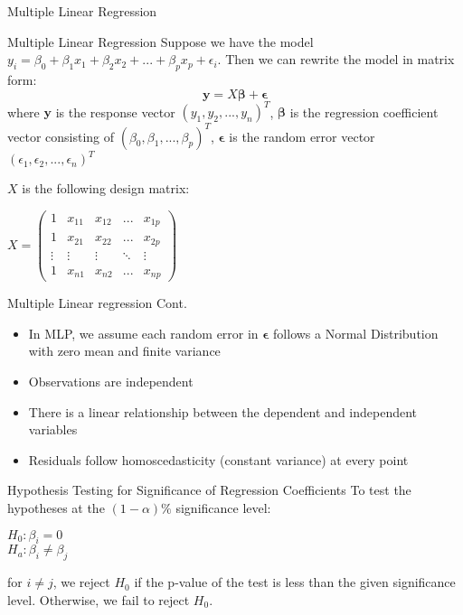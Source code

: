 \documentclass[aspectratio=169,xcolor=dvipsnames]{beamer}
\begin{document}
\begin{frame}{Multiple Linear Regression}
\begin{block}{Multiple Linear Regression}
    Suppose we have the model $y_{i}=\beta_{0}+\beta_{1}x_{1}+\beta_{2}x_{2}+...+\beta_{p}x_{p}+\epsilon_{i}$. Then we can rewrite the model in matrix form:
\begin{equation}
    \boldsymbol{y} = X{\boldsymbol{\beta}}+\boldsymbol{\epsilon}
\end{equation}
where $\boldsymbol{y}$ is the response vector $(y_{1}, y_{2},...,y_{n})^T$, $\boldsymbol{\beta}$ is the regression coefficient vector consisting of $(\beta_{0}, \beta_{1},...,\beta_{p})^T$, $\boldsymbol{\epsilon}$ is the random error vector $(\epsilon_{1}, \epsilon_{2},...,\epsilon_{n})^T$
\end{block}

$X$ is the following design matrix:
\begin{center}
    $X=\begin{pmatrix}
        1 & x_{11} & x_{12} & ... & x_{1p}\\
        1 & x_{21} & x_{22} & ... & x_{2p}\\
        \vdots & \vdots & \vdots & \ddots & \vdots\\
        1 & x_{n1} & x_{n2} & ... & x_{np}
    \end{pmatrix}$
\end{center}
\end{frame}

\begin{frame}{Multiple Linear regression Cont.}

\begin{itemize}
    \item In MLP, we assume each random error in $\boldsymbol{\epsilon}$ follows a Normal Distribution with zero mean and finite variance
    \item Observations are independent
    \item There is a linear relationship between the dependent and independent variables
    \item Residuals follow homoscedasticity (constant variance) at every point
\end{itemize}
\begin{block}{Hypothesis Testing for Significance of Regression Coefficients}
To test the hypotheses at the $(1-\alpha)\%$ significance level:
\begin{center}
    $H_{0}: \beta_{i} = 0$\\
    $H_{a}: \beta_{i} \neq \beta_{j}$
\end{center}
for $i \neq j$, we reject $H_{0}$ if the p-value of the test is less than the given significance level. Otherwise, we fail to reject $H_{0}$.
\end{block}
\end{frame}
\end{document}
